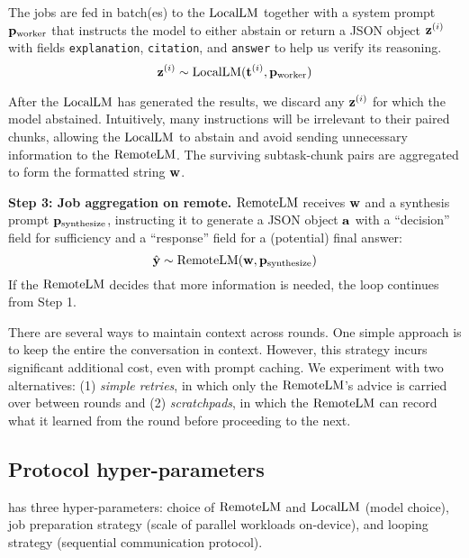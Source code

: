 The jobs are fed in batch(es) to the $\mathrm{LocalLM}$ together with a system prompt $\mathbf{p}_{\text{worker}}$ that instructs the model to either abstain or return a JSON object $\mathbf{z}^{(i)}$ with fields \texttt{explanation}, \texttt{citation}, and \texttt{answer} to help us verify its reasoning. 
\begin{equation}
    \mathbf{z}^{(i)} \sim \mathrm{LocalLM}(\mathbf{t}^{(i)},\mathbf{p}_{\text{worker}})
\end{equation}


After the $\mathrm{LocalLM}$ has generated the results, we discard any $\mathbf{z}^{(i)}$ for which the model abstained. Intuitively, many instructions will be irrelevant to their paired chunks, allowing the $\mathrm{LocalLM}$ to abstain and avoid sending unnecessary information to the $\mathrm{RemoteLM}$.
The surviving subtask-chunk pairs are aggregated to form the formatted string $\mathbf{w}$. 

 

\textbf{Step 3: Job aggregation on remote.}  $\mathrm{RemoteLM}$ receives $\mathbf{w}$ and a synthesis prompt $\mathbf{p}_{\text{synthesize}}$, instructing it to generate a JSON object $\mathbf{a}$ with a ``decision'' field for sufficiency and a ``response'' field for a (potential) final answer:
\begin{equation}
    \hat{\mathbf{y}} \sim \mathrm{RemoteLM}(\mathbf{w}, \mathbf{p}_{\text{synthesize}})
\end{equation}
If the $\mathrm{RemoteLM}$ decides that more information is needed, the loop continues from Step 1. 

There are several ways to maintain context across \system rounds. 
One simple approach is to keep the entire the conversation in context. 
However, this strategy incurs significant additional cost, even with prompt caching. 
We experiment with two alternatives: (1) \textit{simple retries}, in which only the $\mathrm{RemoteLM}$'s advice is carried over between rounds and (2) \textit{scratchpads}, in which the $\mathrm{RemoteLM}$ can record what it learned from the round before proceeding to the next. 




\vspace{-0.5em}
\subsection{Protocol hyper-parameters}
\system has three hyper-parameters: choice of $\mathrm{RemoteLM}$ and $\mathrm{LocalLM}$ (model choice), job preparation strategy (scale of parallel workloads on-device), and  looping strategy (sequential communication protocol).

